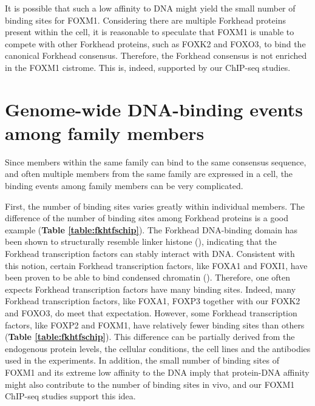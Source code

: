 It is possible that such a low affinity to DNA might yield the small number of binding sites for FOXM1. Considering there are multiple Forkhead proteins present within the cell, it is reasonable to speculate that FOXM1 is unable to compete with other Forkhead proteins, such as FOXK2 and FOXO3, to bind the canonical Forkhead consensus. Therefore, the Forkhead consensus is not enriched in the FOXM1 cistrome. This is, indeed, supported by our ChIP-seq studies.

\section{Genome-wide DNA-binding events among family members}

Since members within the same family can bind to the same consensus sequence, and often multiple members from the same family are expressed in a cell, the binding events among family members can be very complicated.

First, the number of binding sites varies greatly within individual members. The difference of the number of binding sites among Forkhead proteins is a good example (\textbf{Table \ref{table:fkhtfschip}}). The Forkhead DNA-binding domain has been shown to structurally resemble linker histone (\cite{clark1993co-crystal}), indicating that the Forkhead transcription factors can stably interact with DNA. Consistent with this notion, certain Forkhead transcription factors, like FOXA1 and FOXI1, have been proven to be able to bind condensed chromatin (\cite{cirillo1998binding,yan2006the}). Therefore, one often expects Forkhead transcription factors have many binding sites. Indeed, many Forkhead transcription factors, like FOXA1, FOXP3 together with our FOXK2 and FOXO3, do meet that expectation. However, some Forkhead transcription factors, like FOXP2 and FOXM1, have relatively fewer binding sites than others (\textbf{Table \ref{table:fkhtfschip}}). This difference can be partially derived from the endogenous protein levels, the cellular conditions, the cell lines and the antibodies used in the experiments. In addition, the small number of binding sites of FOXM1 and its extreme low affinity to the DNA imply that protein-DNA affinity might also contribute to the number of binding sites in vivo, and our FOXM1 ChIP-seq studies support this idea.

